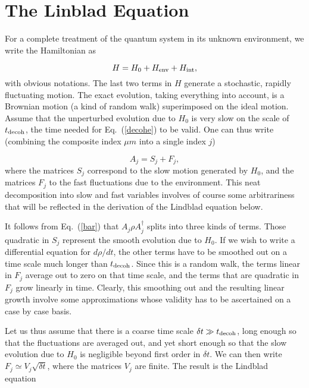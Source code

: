 \documentclass[12pt]{article}
\def\beq{\begin{equation}}
\def\eeq{\end{equation}}
\def\Eq{Eq.~(\ref}
\begin{document}
\section{The Linblad Equation}

For a complete treatment of the quantum system in its unknown
environment, we write the Hamiltonian as

\beq H=H_0+H_{{\rm env}}+H_{{\rm int}}, \eeq
with obvious notations. The last two terms in $H$ generate a stochastic,
rapidly fluctuating motion. The exact evolution, taking everything into
account, is a Brownian motion (a kind of random walk) superimposed on
the ideal motion. Assume that the unperturbed evolution due to $H_0$ is
very slow on the scale of $t_{{\rm decoh}}$, the time needed for
\Eq{decohe}) to be valid. One can thus write (combining the composite
index $\mu m$ into a single index $j$)

\beq A_j = S_j + F_j, \label{bar} \eeq
where the matrices $S_j$ correspond to the slow motion generated by
$H_0$, and the matrices $F_j$ to the fast fluctuations due to the
environment. This neat decomposition into slow and fast variables
involves of course some arbitrariness that will be reflected in the
derivation of the Lindblad equation below.

It follows from Eq.~(\ref{bar}) that $A_j\rho A_j^\dagger$ splits
into three kinds of terms. Those quadratic in $S_j$ represent the smooth
evolution due to $H_0$. If we wish to write a differential equation for
$d\rho/dt$, the other terms have to be smoothed out on a time scale much
longer than $t_{{\rm decoh}}$. Since this is a random walk, the terms
linear in $F_j$ average out to zero on that time scale, and the terms
that are quadratic in $F_j$ grow linearly in time. Clearly, this
smoothing out and the resulting linear growth involve some
approximations whose validity has to be ascertained on a case by case
basis.

Let us thus assume that there is a coarse time scale $\delta t\gg
t_{{\rm decoh}}$, long enough so that the fluctuations are averaged out,
and yet short enough so that the slow evolution due to $H_0$ is
negligible beyond first order in $\delta t$. We can then write
$F_j\simeq V_j\sqrt{\delta t}$, where the matrices $V_j$ are finite. The
result is the Lindblad equation~\cite{lindblad}
\end{document}
